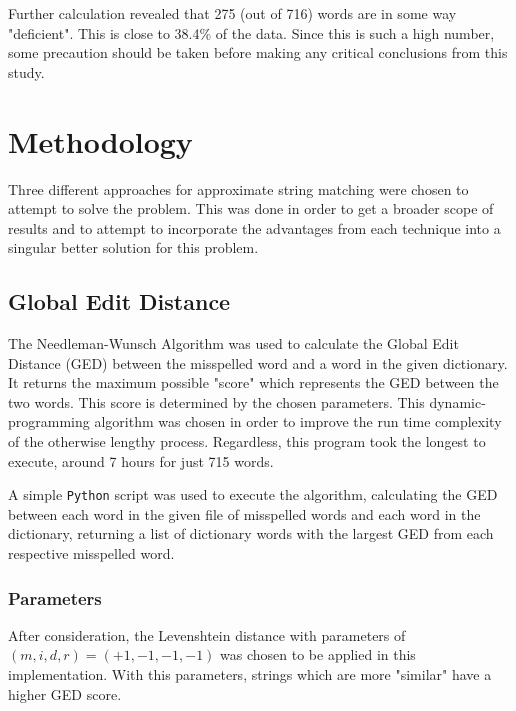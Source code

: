 \documentclass[11pt]{article}
\begin{document}
Further calculation revealed that 275 (out of 716) words are in some way "deficient". This is close to 38.4\% of the data. Since this is such a high number, some precaution should be taken before making any critical conclusions from this study.




\section{Methodology}
Three different approaches for approximate string matching were chosen to attempt to solve the problem. This was done in order to get a broader scope of results and to attempt to incorporate the advantages from each technique into a singular better solution for this problem. %



\subsection{Global Edit Distance}
The Needleman-Wunsch Algorithm %
was used to calculate the Global Edit Distance (GED) between the misspelled word and a word in the given dictionary. It returns the maximum possible "score" which represents the GED between the two words. This score is determined by the chosen parameters. This dynamic-programming algorithm was chosen in order to improve the run time complexity of the otherwise lengthy process. Regardless, this program took the longest to execute, around 7 hours for just 715 words. 

A simple \texttt{Python} script was used to execute the algorithm, calculating the GED between each word in the given file of misspelled words and each word in the dictionary, returning a list of dictionary words with the largest GED from each respective misspelled word.

\subsubsection{Parameters}
After consideration, the Levenshtein distance %
with parameters of \((m, i, d, r) = (+1, -1, -1, -1)\) was chosen to be applied in this implementation. With this parameters, strings which are more "similar" have a higher GED score. %
\end{document}
